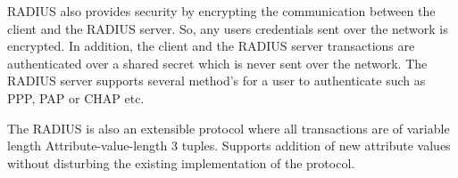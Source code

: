 RADIUS also provides security by encrypting the communication between the client and the RADIUS server. So,  any users credentials sent over the network is encrypted. In addition, the client and the RADIUS server transactions are authenticated over a shared secret which is never sent over the network. The RADIUS server supports several method’s for a user to authenticate such as PPP, PAP or CHAP etc.

The RADIUS is also an extensible protocol where all transactions are of variable length Attribute-value-length 3 tuples. Supports addition of new attribute values without disturbing the existing implementation of the protocol.


%	

